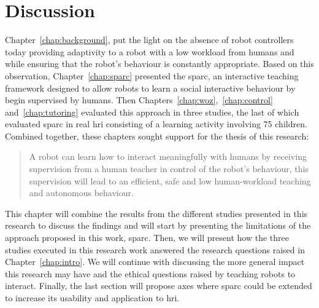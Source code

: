 \chapter{Discussion} \label{chap:discussion}
\glsresetall

Chapter~\ref{chap:background}, put the light on the absence of robot controllers today providing adaptivity to a robot with a low workload from humans and while ensuring that the robot's behaviour is constantly appropriate. Based on this observation, Chapter~\ref{chap:sparc} presented the \gls{sparc}, an interactive teaching framework designed to allow robots to learn a social interactive behaviour by begin supervised by humans. Then Chapters~\ref{chap:woz},~\ref{chap:control} and~\ref{chap:tutoring} evaluated this approach in three studies, the last of which evaluated \gls{sparc} in real \gls{hri} consisting of a learning activity involving 75 children. Combined together, these chapters sought support for the thesis of this research:

\begin{quote}
	A robot can learn how to interact meaningfully with humans by receiving supervision from a human teacher in control of the robot's behaviour, this supervision will lead to an efficient, safe and low human-workload teaching and autonomous behaviour.	
\end{quote}

This chapter will combine the results from the different studies presented in this research to discuss the findings and will start by presenting the limitations of the approach proposed in this work, \gls{sparc}. Then, we will present how the three studies executed in this research work answered the research questions raised in Chapter~\ref{chap:intro}. We will continue with discussing the more general impact this research may have and the ethical questions raised by teaching robots to interact.
Finally, the last section will propose axes where \gls{sparc} could be extended to increase its usability and application to \gls{hri}.


